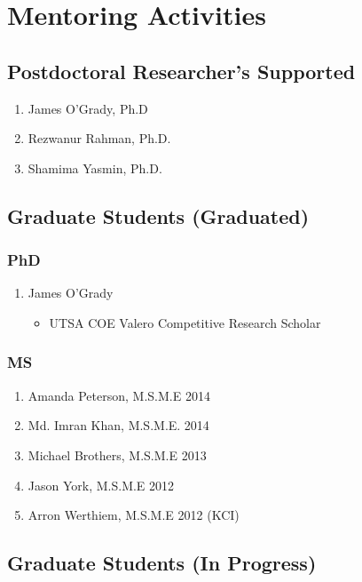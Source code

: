 \section*{Mentoring Activities}


\subsection*{Postdoctoral Researcher's Supported}
  \begin{enumerate}
    \item James O'Grady, Ph.D
    \item Rezwanur Rahman, Ph.D.
    \item Shamima Yasmin, Ph.D.
  \end{enumerate}

\subsection*{Graduate Students (Graduated)}

\subsubsection*{PhD}
\begin{enumerate}
  \item James O'Grady
      \begin{itemize}
        \item UTSA COE Valero Competitive Research Scholar
      \end{itemize}
\end{enumerate}

\subsubsection*{MS}
\begin{enumerate}
    \item Amanda Peterson, M.S.M.E 2014
    \item Md. Imran Khan, M.S.M.E. 2014
    \item Michael Brothers, M.S.M.E 2013
    \item Jason York, M.S.M.E 2012
    \item Arron Werthiem, M.S.M.E 2012 (KCI)
\end{enumerate}

\subsection*{Graduate Students (In Progress)}

